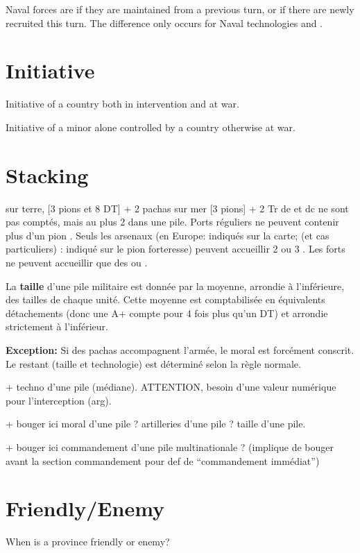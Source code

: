 \aparag[Navy] Naval forces are  if they are maintained from a
previous turn, or  if there are newly recruited this turn.
\bparag The difference only occurs for Naval technologies  and
.%


\section{Initiative}
Initiative of a country both in intervention and at war.

Initiative of a minor alone controlled by a country otherwise at war.

\section{Stacking}\label{chMilitary:Stacking}
\aparag[Empilement]
\bparag sur terre, [3 pions et 8 DT] + 2 pachas
\bparag  sur mer [3 pions] + 2 Tr
\bparag de et dc ne sont pas comptés, mais au plus 2 dans une pile.
 Ports réguliers ne peuvent contenir plus d'un pion
\FLEET.  Seuls les arsenaux (en Europe: indiqués sur la carte; \ROTW (et cas
particuliers) : indiqué sur le pion forteresse) peuvent accueillir 2 ou 3
\FLEET.  Les forts ne peuvent accueillir que des \DN ou \NDE.

La \textbf{taille} d'une pile militaire est donnée par la moyenne,
arrondie à l'inférieure, des tailles de chaque unité. Cette moyenne
est comptabilisée en équivalents détachements (donc une A+
compte pour 4 fois plus qu'un DT) et arrondie strictement à l'inférieur.

\textbf{Exception:} Si des pachas accompagnent l'armée, le moral est forcément
conscrit. Le restant (taille et technologie) est déterminé selon la règle
normale.

+ techno d'une pile (médiane). ATTENTION, besoin d'une valeur numérique pour
l'interception (arg).

+ bouger ici moral d'une pile ? artilleries d'une pile ? taille d'une pile.

+ bouger ici commandement d'une pile multinationale ? (implique de bouger
avant la section commandement pour def de ``commandement immédiat'')

\section{Friendly/Enemy}
When is a province friendly or enemy?

